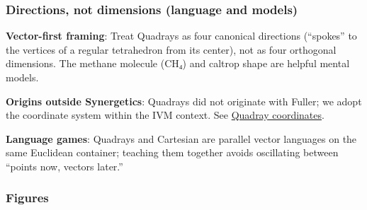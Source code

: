 \documentclass[
  10pt,
]{article}
\begin{document}
\hypertarget{directions-not-dimensions-language-and-models}{%
\subsubsection{Directions, not dimensions (language and
models)}\label{directions-not-dimensions-language-and-models}}

\textbf{Vector-first framing}: Treat Quadrays as four canonical
directions (``spokes'' to the vertices of a regular tetrahedron from its
center), not as four orthogonal dimensions. The methane molecule (CH₄)
and caltrop shape are helpful mental models.

\textbf{Origins outside Synergetics}: Quadrays did not originate with
Fuller; we adopt the coordinate system within the IVM context. See
\href{https://en.wikipedia.org/wiki/Quadray_coordinates}{Quadray
coordinates}.

\textbf{Language games}: Quadrays and Cartesian are parallel vector
languages on the same Euclidean container; teaching them together avoids
oscillating between ``points now, vectors later.''

\hypertarget{figures}{%
\subsubsection{Figures}\label{figures}}
\end{document}
